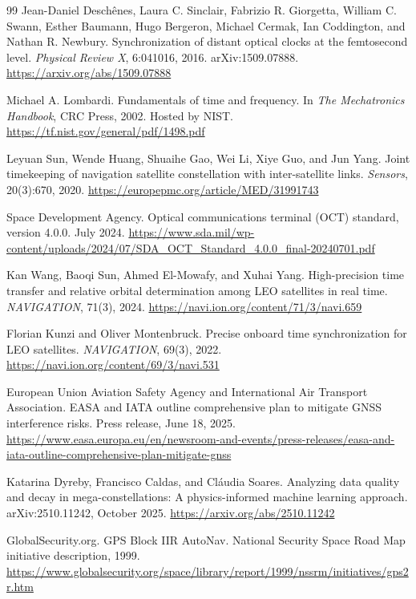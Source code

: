 \documentclass[twocolumn,10pt]{article}
\begin{document}
\begin{thebibliography}{99}
Jean-Daniel Desch\^enes, Laura C. Sinclair, Fabrizio R. Giorgetta, William C. Swann, Esther Baumann, Hugo Bergeron, Michael Cermak, Ian Coddington, and Nathan R. Newbury.
Synchronization of distant optical clocks at the femtosecond level.
\textit{Physical Review X}, 6:041016, 2016. arXiv:1509.07888.
\url{https://arxiv.org/abs/1509.07888}

Michael A. Lombardi.
Fundamentals of time and frequency.
In \textit{The Mechatronics Handbook}, CRC Press, 2002. Hosted by NIST.
\url{https://tf.nist.gov/general/pdf/1498.pdf}

Leyuan Sun, Wende Huang, Shuaihe Gao, Wei Li, Xiye Guo, and Jun Yang.
Joint timekeeping of navigation satellite constellation with inter-satellite links.
\textit{Sensors}, 20(3):670, 2020.
\url{https://europepmc.org/article/MED/31991743}

Space Development Agency.
Optical communications terminal (OCT) standard, version 4.0.0.
July 2024.
\url{https://www.sda.mil/wp-content/uploads/2024/07/SDA_OCT_Standard_4.0.0_final-20240701.pdf}

Kan Wang, Baoqi Sun, Ahmed El-Mowafy, and Xuhai Yang.
High-precision time transfer and relative orbital determination among LEO satellites in real time.
\textit{NAVIGATION}, 71(3), 2024.
\url{https://navi.ion.org/content/71/3/navi.659}

Florian Kunzi and Oliver Montenbruck.
Precise onboard time synchronization for LEO satellites.
\textit{NAVIGATION}, 69(3), 2022.
\url{https://navi.ion.org/content/69/3/navi.531}

European Union Aviation Safety Agency and International Air Transport Association.
EASA and IATA outline comprehensive plan to mitigate GNSS interference risks.
Press release, June 18, 2025.
\url{https://www.easa.europa.eu/en/newsroom-and-events/press-releases/easa-and-iata-outline-comprehensive-plan-mitigate-gnss}

Katarina Dyreby, Francisco Caldas, and Cl\'audia Soares.
Analyzing data quality and decay in mega-constellations: A physics-informed machine learning approach.
arXiv:2510.11242, October 2025.
\url{https://arxiv.org/abs/2510.11242}

GlobalSecurity.org.
GPS Block IIR AutoNav.
National Security Space Road Map initiative description, 1999.
\url{https://www.globalsecurity.org/space/library/report/1999/nssrm/initiatives/gps2r.htm}


\end{thebibliography}
\end{document}
